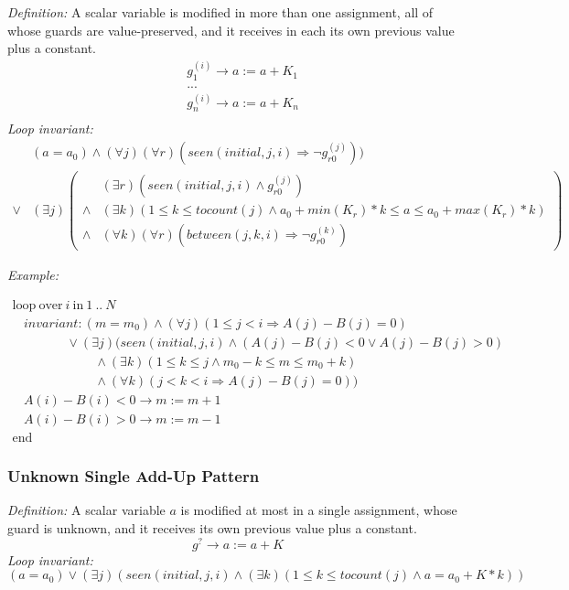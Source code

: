 \documentclass[a4paper,10pt]{article}
\newcommand{\idx}{\ensuremath{i}\xspace}
\newcommand{\idxinitial}{\ensuremath{\mathit{initial}}\xspace}
\newcommand{\at}[1]{{(#1)}}
\newcommand{\KWloop}{\ensuremath{\mathrm{loop}~}}
\newcommand{\KWend}{\ensuremath{\mathrm{end}~}}
\newcommand{\KWover}{\ensuremath{\mathrm{over}~}}
\newcommand{\KWin}{\ensuremath{~\mathrm{in}~}}
\newcommand{\impl}{\ensuremath{\Longrightarrow}}
\newcommand{\seen}[3]{\ensuremath{\mathit{seen}{(#1,#2,#3)}}\xspace}
\newcommand{\tocount}[1]{\ensuremath{\mathit{tocount}(#1)}\xspace}
\newcommand{\between}[3]{\ensuremath{\mathit{between}{(#1,#2,#3)}}\xspace}
\newcommand{\loopinvariant}{\noindent\textit{Loop invariant:}\xspace}
\newcommand{\patterndef}{\noindent\textit{Definition:}\xspace}
\newcommand{\patternexample}{\noindent\textit{Example:}\xspace}
\begin{document}
\patterndef A scalar variable is modified in more than one assignment, all of
whose guards are value-preserved, and it receives in each its own previous value
plus a constant.
%
\begin{eqnarray*}
&g_1^\at{\idx} \rightarrow a := a + K_1\\
&...\\
&g_n^\at{\idx} \rightarrow a := a + K_n\\
\end{eqnarray*}
%
\loopinvariant
%
\begin{eqnarray*}
&(a = a_0) \land (\forall j)(\forall r)( \seen{\idxinitial}{j}{\idx} \impl \neg g_{r0}^\at{j})) \\
\lor 
& (\exists j)
\left(\begin{array}{cl}
&(\exists r)(\seen{\idxinitial}{j}{\idx} \land g_{r0}^\at{j}) \\
\land& (\exists k)(1 \leq k \leq \tocount{j} \land a_0 + \mathit{min}(K_r) * k \leq a \leq a_0 + \mathit{max}(K_r) * k) \\
\land& (\forall k)(\forall r)(\between{j}{k}{\idx} \impl \neg g_{r0}^\at{k})
\end{array}\right)
\end{eqnarray*}

\bigskip
\patternexample

\medskip
$\begin{array}{l}
  \KWloop \KWover i \KWin 1~..~N \\
  ~~~~ \textit{invariant}: (m = m_0) \land (\forall j)(1\leq j < i \impl A(j)-B(j) = 0)\\
  ~~~~~~~~~~~~~~~~~~~ \lor (\exists j)(\seen{\idxinitial}{j}{\idx} \land (A(j)-B(j) < 0 \lor A(j)-B(j) > 0) \\
  ~~~~~~~~~~~~~~~~~~~~~~~~~~~~~ \land (\exists k)(1 \leq k \leq j \land m_0-k \leq m \leq m_0 +k) \\
  ~~~~~~~~~~~~~~~~~~~~~~~~~~~~~ \land (\forall k)(j < k < i \impl A(j)-B(j) = 0))\\
  ~~~~ A(i)-B(i) < 0 \rightarrow m := m+1\\
  ~~~~ A(i)-B(i) > 0 \rightarrow m := m-1\\
  \KWend
\end{array}$

\subsubsection*{Unknown Single Add-Up Pattern}

\patterndef A scalar variable $a$ is modified at most in a single assignment, whose
guard is unknown, and it receives its own previous value plus a constant.
%
$$g^? \rightarrow a := a + K$$
%
\loopinvariant
%
$$(a = a_0) \lor (\exists j)(\seen{\idxinitial}{j}{\idx} \land (\exists k)(1 \leq k \leq \tocount{j} \land a = a_0 + K * k))$$
\end{document}
